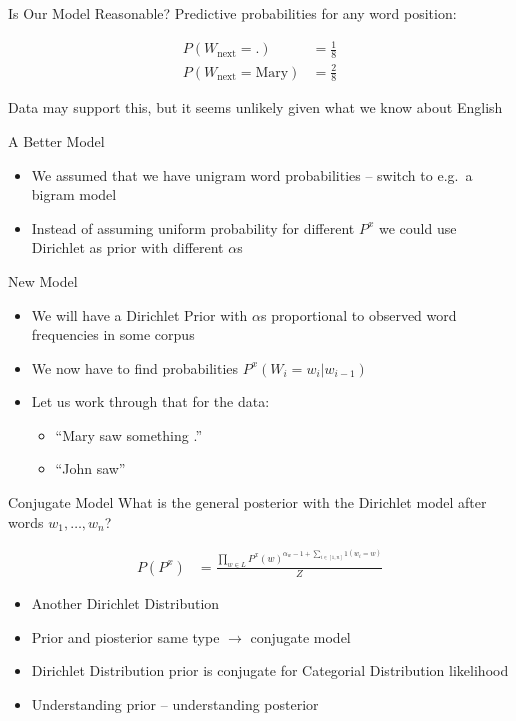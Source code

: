 \documentclass[11pt]{beamer}
\begin{document}
	\begin{frame}{Is Our Model Reasonable?}
		Predictive probabilities for any word position:
		
		\begin{align*}
			P(W_{\text{next}} = \text{.}) & = \frac{1}{8} \\
			P(W_{\text{next}} = \text{Mary}) & = \frac{2}{8}
		\end{align*}
		
		\vspace{10pt}Data may support this, but it seems unlikely given what we know about English
	\end{frame}
	
	\begin{frame}{A Better Model}
		\begin{itemize}
			\item We assumed that we have unigram word probabilities -- switch to e.g.\ a bigram model
			\item Instead of assuming uniform probability for different $P^{x}$ we could use Dirichlet as prior with different $\alpha$s
		\end{itemize}
	\end{frame}
	
	\begin{frame}{New Model}
		\begin{itemize}
			\item<1-> We will have a Dirichlet Prior with $\alpha$s proportional to observed word frequencies in some corpus
			\item<1-> We now have to find probabilities $P^{x}(W_i = w_i|w_{i-1})$
			\item<2-> Let us work through that for the data:
				\begin{itemize}
					\item<2-> ``Mary saw something .''
					\item<2-> ``John saw''
				\end{itemize}
		\end{itemize}
	\end{frame}
	
	\begin{frame}{Conjugate Model}
		What is the general posterior with the Dirichlet model after words $w_1,\dots,w_n$?
		
		\begin{align*}
			P(P^{x}) & = \frac{\prod_{w \in L} P^{x}(w)^{\alpha_{w}-1+\sum_{i \in [1,n]} 1(w_i = w)}}{Z}
		\end{align*}			
		
		\begin{itemize}
			\item Another Dirichlet Distribution
			\item Prior and piosterior same type $\rightarrow$ conjugate model
			\item Dirichlet Distribution prior is conjugate for Categorial Distribution likelihood
			\item Understanding prior -- understanding posterior
		\end{itemize}
	\end{frame}
	
\end{document}
